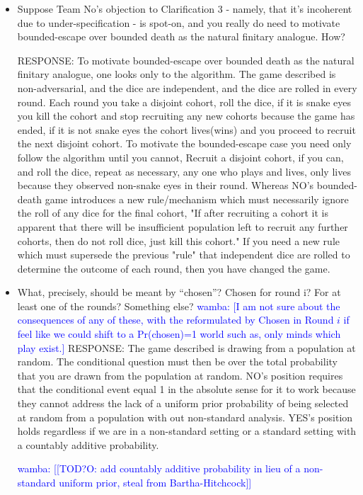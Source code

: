 \documentclass[article,twocolumn]{memoir}
\newcommand{\wamba} [1]{\ifnum\Chatty=1 \textcolor{blue}{wamba:  [#1]} \fi}
\begin{document}
\begin{itemize}
\item Suppose Team No’s objection to Clarification 3 - namely, that it’s incoherent due to under-specification - is spot-on, and you really do need to motivate bounded-escape over bounded death as the natural finitary analogue. How?

    {\color{violet}
        RESPONSE: 
        To motivate bounded-escape over bounded death as the natural finitary analogue, one looks only to the algorithm. The game described is non-adversarial, and the dice are independent, and the dice are rolled in every round.  Each round you take a disjoint cohort, roll the dice, if it is snake eyes you kill the cohort and stop recruiting any new cohorts because the game has ended, if it is not snake eyes the cohort lives(wins) and you proceed to recruit the next disjoint cohort.  To motivate the bounded-escape case you need only follow the algorithm until you cannot, Recruit a disjoint cohort, if you can, and roll the dice, repeat as necessary, any one who plays and lives, only lives because they observed non-snake eyes in their round. Whereas NO's bounded-death game introduces a new rule/mechanism which must necessarily ignore the roll of any dice for the final cohort, "If after recruiting a cohort it is apparent that there will be insufficient population left to recruit any further cohorts, then do not roll dice, just kill this cohort."  If you need a new rule which must supersede the previous "rule" that independent dice are rolled to determine the outcome of each round, then you have changed the game.
    }
\item What, precisely, should be meant by “chosen”? Chosen for round i? For at least one of the rounds? Something else?
    \wamba{I am not sure about the consequences of any of these,  with the reformulated by Chosen in Round $i$ if feel like we could shift to a Pr(chosen)=1 world such as, only minds which play exist.}
    {\color{violet}
        RESPONSE: 
        The game described is drawing from a population at random. The conditional question must then be over the total probability that you are drawn from the population at random. NO's position requires that the conditional event equal 1 in the absolute sense for it to work because they cannot address the lack of a uniform prior probability of being selected at random from a population with out non-standard analysis.  YES's position holds regardless if we are in a non-standard setting or a standard setting with a countably additive probability.
    }
    
        \wamba{[TOD?O: add countably additive probability in lieu of a non-standard uniform prior, steal from Bartha-Hitchcock]}
        

\end{itemize}
\end{document}
